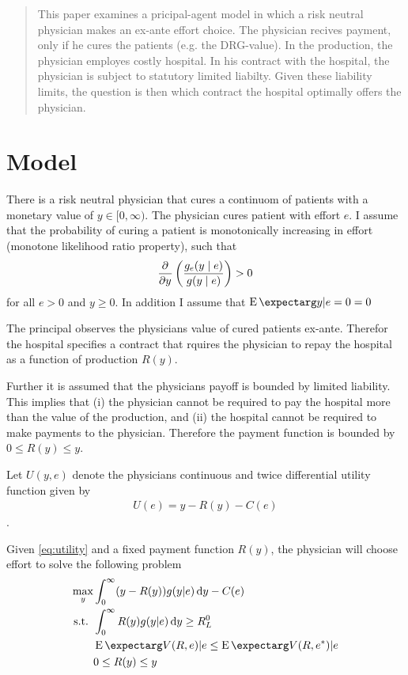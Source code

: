 


\maketitle
\begin{abstract}
This paper examines a pricipal-agent model in which a risk neutral physician makes an ex-ante effort choice. The physician recives payment, only if he cures the patients (e.g. the DRG-value). In the production, the physician employes costly hospital. In his contract with the hospital, the physician is subject to statutory limited liabilty. Given these liability limits, the question is then which contract the hospital optimally offers the physician. 
\end{abstract}
\section{Model} %
\label{sec:model}
There is a risk neutral physician that cures a continuom of patients with a monetary value of $y\in[0,\infty)$. The physician cures patient with effort $e$. I assume that the probability of curing a patient is monotonically increasing in effort (monotone likelihood ratio property), such that 
\begin{align}
    \pder{y}\left(\frac{g_e(y\mid e)}{g(y\mid e)}\right)>0 \label{eq:mlrp}
\end{align}
for all $e>0$ and $y\ge 0$. In addition I assume that $\cEX{y|e=0}=0$

The principal observes the physicians value of cured patients ex-ante. Therefor the hospital specifies a contract that rquires the physician to repay the hospital as a function of production $R(y)$.

Further it is assumed that the physicians payoff is bounded by limited liability. This implies that (i) the physician cannot be required to pay the hospital more than the value of the production, and (ii) the hospital cannot be required to make payments to the physician.  Therefore the payment function is bounded by $0\leq R(y)\leq y$.

Let $U(y,e)$ denote the physicians continuous and twice differential utility function given by 
\begin{align}
    U(e)=y-R(y)-C(e) \label{eq:utility}
\end{align}.

Given \cref{eq:utility} and a fixed payment function $R(y)$, the physician will choose effort to solve the following problem
\begin{subequations}
\begin{align}
    \max_{y} & \int_0^{\infty}(y-R(y))g(y|e)\dif y-C(e)\label{eq:max-utility} \\
    \text{s.t. }    & \int_{0}^{\infty} R(y)g(y|e)\dif y\geq R_L^0 \label{eq:minimum-payment} \\
                    & \cEX{V(R,e)|e}\leq \cEX{V(R,e^*)|e} \label{eq:optimal-effort}\\
                    & 0\leq R(y)\leq y \label{eq:limited-liability}
\end{align}
\end{subequations}

